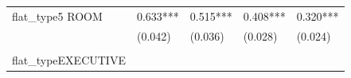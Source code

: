 \documentclass[]{book}
\begin{document}
\begin{longtable}[]{@{}lllll@{}}
\begin{minipage}[t]{0.15\columnwidth}
flat\_type5 ROOM\strut
\end{minipage} & \begin{minipage}[t]{0.17\columnwidth}\raggedright\strut
0.633***\strut
\end{minipage} & \begin{minipage}[t]{0.17\columnwidth}\raggedright\strut
0.515***\strut
\end{minipage} & \begin{minipage}[t]{0.18\columnwidth}\raggedright\strut
0.408***\strut
\end{minipage} & \begin{minipage}[t]{0.18\columnwidth}\raggedright\strut
0.320***\strut
\end{minipage}\tabularnewline
\begin{minipage}[t]{0.15\columnwidth}\raggedright\strut
\strut
\end{minipage} & \begin{minipage}[t]{0.17\columnwidth}\raggedright\strut
(0.042)\strut
\end{minipage} & \begin{minipage}[t]{0.17\columnwidth}\raggedright\strut
(0.036)\strut
\end{minipage} & \begin{minipage}[t]{0.18\columnwidth}\raggedright\strut
(0.028)\strut
\end{minipage} & \begin{minipage}[t]{0.18\columnwidth}\raggedright\strut
(0.024)\strut
\end{minipage}\tabularnewline
\begin{minipage}[t]{0.15\columnwidth}\raggedright\strut
\strut
\end{minipage} & \begin{minipage}[t]{0.17\columnwidth}\raggedright\strut
\strut
\end{minipage} & \begin{minipage}[t]{0.17\columnwidth}\raggedright\strut
\strut
\end{minipage} & \begin{minipage}[t]{0.18\columnwidth}\raggedright\strut
\strut
\end{minipage} & \begin{minipage}[t]{0.18\columnwidth}\raggedright\strut
\strut
\end{minipage}\tabularnewline
\begin{minipage}[t]{0.15\columnwidth}\raggedright\strut
flat\_typeEXECUTIVE\strut
\end{minipage} & \begin{minipage}[t]{0.17\columnwidth}\raggedright\strut

\end{minipage}
\end{longtable}
\end{document}
